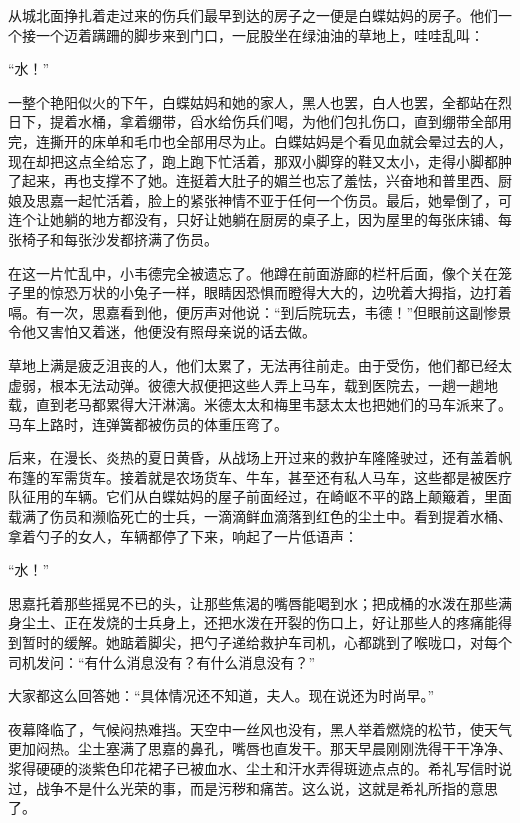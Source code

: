 \par 从城北面挣扎着走过来的伤兵们最早到达的房子之一便是白蝶姑妈的房子。他们一个接一个迈着蹒跚的脚步来到门口，一屁股坐在绿油油的草地上，哇哇乱叫：
\par “水！”
\par 一整个艳阳似火的下午，白蝶姑妈和她的家人，黑人也罢，白人也罢，全都站在烈日下，提着水桶，拿着绷带，舀水给伤兵们喝，为他们包扎伤口，直到绷带全部用完，连撕开的床单和毛巾也全部用尽为止。白蝶姑妈是个看见血就会晕过去的人，现在却把这点全给忘了，跑上跑下忙活着，那双小脚穿的鞋又太小，走得小脚都肿了起来，再也支撑不了她。连挺着大肚子的媚兰也忘了羞怯，兴奋地和普里西、厨娘及思嘉一起忙活着，脸上的紧张神情不亚于任何一个伤员。最后，她晕倒了，可连个让她躺的地方都没有，只好让她躺在厨房的桌子上，因为屋里的每张床铺、每张椅子和每张沙发都挤满了伤员。
\par 在这一片忙乱中，小韦德完全被遗忘了。他蹲在前面游廊的栏杆后面，像个关在笼子里的惊恐万状的小兔子一样，眼睛因恐惧而瞪得大大的，边吮着大拇指，边打着嗝。有一次，思嘉看到他，便厉声对他说：“到后院玩去，韦德！”但眼前这副惨景令他又害怕又着迷，他便没有照母亲说的话去做。
\par 草地上满是疲乏沮丧的人，他们太累了，无法再往前走。由于受伤，他们都已经太虚弱，根本无法动弹。彼德大叔便把这些人弄上马车，载到医院去，一趟一趟地载，直到老马都累得大汗淋漓。米德太太和梅里韦瑟太太也把她们的马车派来了。马车上路时，连弹簧都被伤员的体重压弯了。
\par 后来，在漫长、炎热的夏日黄昏，从战场上开过来的救护车隆隆驶过，还有盖着帆布篷的军需货车。接着就是农场货车、牛车，甚至还有私人马车，这些都是被医疗队征用的车辆。它们从白蝶姑妈的屋子前面经过，在崎岖不平的路上颠簸着，里面载满了伤员和濒临死亡的士兵，一滴滴鲜血滴落到红色的尘土中。看到提着水桶、拿着勺子的女人，车辆都停了下来，响起了一片低语声：
\par “水！”
\par 思嘉托着那些摇晃不已的头，让那些焦渴的嘴唇能喝到水；把成桶的水泼在那些满身尘土、正在发烧的士兵身上，还把水泼在开裂的伤口上，好让那些人的疼痛能得到暂时的缓解。她踮着脚尖，把勺子递给救护车司机，心都跳到了喉咙口，对每个司机发问：“有什么消息没有？有什么消息没有？”
\par 大家都这么回答她：“具体情况还不知道，夫人。现在说还为时尚早。”
\par 夜幕降临了，气候闷热难挡。天空中一丝风也没有，黑人举着燃烧的松节，使天气更加闷热。尘土塞满了思嘉的鼻孔，嘴唇也直发干。那天早晨刚刚洗得干干净净、浆得硬硬的淡紫色印花裙子已被血水、尘土和汗水弄得斑迹点点的。希礼写信时说过，战争不是什么光荣的事，而是污秽和痛苦。这么说，这就是希礼所指的意思了。
